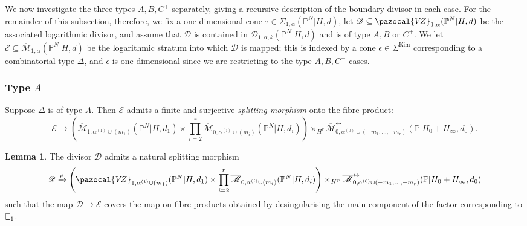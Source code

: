 \documentclass[11pt]{amsart}
\newcommand{\sqC}{\scalebox{0.8}[1.3]{$\sqsubset$}}
\newcommand{\Kim}{\operatorname{Kim}}
\newcommand{\PP}{\mathbb P}
\newcommand{\VZ}{\pazocal{V\!Z}}
\renewcommand{\to}{\rightarrow}
\newcommand{\Mcal}{\mathcal{M}}
\newcommand{\Dcal}{\mathcal{D}}
\newcommand{\Ecal}{\mathcal{E}}
\newcommand{\ol}[1]{\overline{#1}}
\theoremstyle{definition}
\newtheorem{lemma}[thm]{Lemma}
\theoremstyle{definition}
\begin{document}
We now investigate the three types $A,B,C^+$ separately, giving a recursive description of the boundary divisor in each case. For the remainder of this subsection, therefore, we fix a one-dimensional cone $\tau \in \Sigma_{1,\alpha}(\PP^N|H,d)$, let $\Dcal \subseteq \VZ_{1,\alpha}(\PP^N|H,d)$ be the associated logarithmic divisor, and assume that $\Dcal$ is contained in $\Dcal_{1,\alpha,k}(\PP^N|H,d)$ and is of type $A,B$ or $C^+$. We let $\Ecal \subseteq \ol\Mcal_{1,\alpha}(\PP^N|H,d)$ be the logarithmic stratum into which $\Dcal$ is mapped; this is indexed by a cone $\epsilon \in \Sigma^{\Kim}$ corresponding to a combinatorial type $\Delta$, and $\epsilon$ is one-dimensional since we are restricting to the type $A,B,C^+$ cases.


\subsubsection{Type $A$}\label{subsubsection type A} Suppose $\Delta$ is of type $A$. Then $\Ecal$ admits a finite and surjective \textit{splitting morphism} onto the fibre product:
\begin{equation*} \Ecal \to \left( \ol\Mcal_{1,\alpha^{(1)}\cup(m_1)}(\PP^N|H,d_1) \times \prod_{i=2}^r \ol\Mcal_{0,\alpha^{(i)}\cup(m_i)}(\PP^N|H,d_i) \right) \times_{H^r} \ol\Mcal^{\leftrightarrow}_{0,\alpha^{(0)}\cup (-m_1,\ldots,-m_r)}(\mathbb{P}|H_0+H_\infty,d_0).\end{equation*}

\begin{lemma} \label{Lemma type A gluing} The divisor $\Dcal$ admits a natural splitting morphism
\begin{equation*}\Dcal \xrightarrow{\rho} \left(\VZ_{1,\alpha^{(1)}\cup(m_1)}(\PP^N|H,d_1)\times\prod_{i=2}^r \ol\Mcal_{0,\alpha^{(i)}\cup(m_i)}(\PP^N|H,d_i)\right) \times_{H^r} \ol\Mcal^{\leftrightarrow}_{0,\alpha^{(0)}\cup (-m_1,\ldots,-m_r)}(\mathbb{P}|H_0+H_\infty,d_0)\end{equation*}
such that the map $\Dcal \to \Ecal$ covers the map on fibre products obtained by desingularising the main component of the factor corresponding to $\sqC_1$.\end{lemma}
\end{document}
